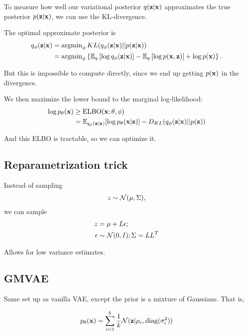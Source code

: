 To measure how well our variational posterior $q(\mathbf{z} | \mathbf{x})$ approximates the true posterior $p(\mathbf{z} | \mathbf{x})$, we can use the KL-divergence.

The optimal approximate posterior is
  \begin{align*}
  q_{\phi}(\mathbf{z} | \mathbf{x}) &= \operatorname{argmin}_{\phi} KL(q_{\phi}(\mathbf{z} | \mathbf{x}) || p(\mathbf{z} | \mathbf{x})) \\
  &= \operatorname{argmin}_{\phi} \left \{ \mathbb{E}_{q}\left[ \log q_{\phi}(\mathbf{z} | \mathbf{x}) \right] - \mathbb{E}_{q} \left[ \log p(\mathbf{x}, \mathbf{z}) \right] + \log p(\mathbf{x}) \right \}.
  \end{align*}

But this is impossible to compute directly, since we end up getting $p(\mathbf{x})$ in the divergence.

We then maximize the lower bound to the marginal log-likelihood:
\begin{align*}
  \log p_{\theta}(\mathbf{x}) &\geq \text{ELBO}(\mathbf{x}; \theta, \phi) \\
&= \mathbb{E}_{q_{\phi}(\mathbf{z} | \mathbf{x})} [\log p_{\theta}(\mathbf{x} | \mathbf{z})] - D_{KL} (q_{\phi}(\mathbf{z} | \mathbf{x}) || p(\mathbf{z}))
\end{align*}

And this ELBO is tractable, so we can optimize it.

\subsection{Reparametrization trick}


Instead of sampling
\begin{align*}
  z \sim \mathcal{N}(\mu, \Sigma),
\end{align*}
we can sample
\begin{align*}
  z &= \mu + L \epsilon; \\
  \epsilon &\sim \mathcal{N}(0, I); \Sigma = L L^T
\end{align*}

Allows for low variance estimates.


\subsection{GMVAE}

Same set up as vanilla VAE, except the prior is a mixture of Gaussians.  That is,

\[
  p_{\theta}(\mathbf{x}) = \sum_{i=1}^{k} \frac{1}{k} \mathcal{N} (\mathbf{z} | \mu_i, \operatorname{diag}(\sigma_i^2))
\]

